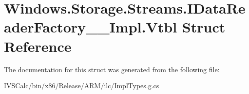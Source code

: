 \hypertarget{struct_windows_1_1_storage_1_1_streams_1_1_i_data_reader_factory_____impl_1_1_vtbl}{}\section{Windows.\+Storage.\+Streams.\+I\+Data\+Reader\+Factory\+\_\+\+\_\+\+Impl.\+Vtbl Struct Reference}
\label{struct_windows_1_1_storage_1_1_streams_1_1_i_data_reader_factory_____impl_1_1_vtbl}


The documentation for this struct was generated from the following file\+:\begin{DoxyCompactItemize}
\item 
I\+V\+S\+Calc/bin/x86/\+Release/\+A\+R\+M/ilc/Impl\+Types.\+g.\+cs\end{DoxyCompactItemize}
